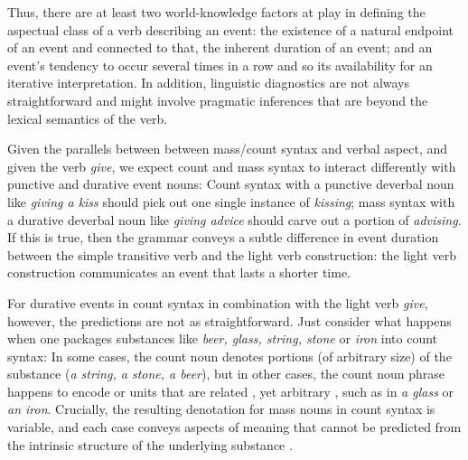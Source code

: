 \documentclass[review,12pt,authoryear]{elsarticle}
\begin{document}
{Thus, there are at least two world-knowledge factors at play in defining the aspectual class of a verb describing an event: the existence of a natural endpoint of an event and connected to that, the inherent duration of an event; and an event's tendency to occur several times in a row and so its availability for an iterative interpretation. In addition, linguistic diagnostics are not always straightforward and might involve pragmatic inferences that are beyond the lexical semantics of the verb.} 

 Given the parallels between between mass/count syntax and verbal aspect, and given the  verb \emph{give}, we expect count and mass syntax to interact differently with punctive and durative event nouns: Count syntax with a punctive deverbal noun like \emph{giving a kiss} should pick out one single instance of \emph{kissing}; mass syntax with a durative deverbal noun like \emph{giving advice} should carve out a portion of \emph{advising}. If this is true, then the grammar conveys a subtle difference in event duration between the simple transitive verb and the light verb construction: the light verb construction communicates an event that lasts a shorter time.

For durative events in count syntax in combination with the  light verb \emph{give}, however, the predictions are not as straightforward. Just consider what happens when one packages substances like \emph{beer, glass, string, stone} or \emph{iron} into count syntax: In some cases, the count noun denotes portions (of arbitrary size) of the substance (\emph{a string, a stone, a beer}), but in other cases, the count noun phrase happens to encode  or units that are related , yet  arbitrary , such as in \emph{a glass} or \emph{an iron}. Crucially, the resulting denotation for mass nouns in count syntax is variable, and each case conveys aspects of meaning that cannot be predicted from the intrinsic structure of the underlying substance  \citep{gordon1985evaluating,srinivasan2015concepts}. 
\end{document}
